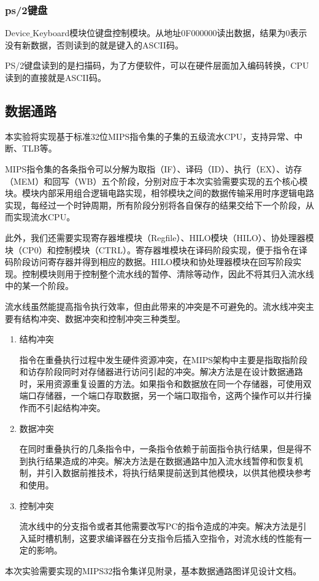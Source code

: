 \subsubsection{ps/2键盘}
Device$\_$Keyboard模块位键盘控制模块。从地址0F000000读出数据，结果为0表示没有新数据，否则读到的就是键入的ASCII码。

PS/2键盘读到的是扫描码，为了方便软件，可以在硬件层面加入编码转换，CPU读到的直接就是ASCII码。
\subsection{数据通路}
本实验将实现基于标准32位MIPS指令集的子集的五级流水CPU，支持异常、中断、TLB等。

MIPS指令集的各条指令可以分解为取指（IF）、译码（ID）、执行（EX）、访存（MEM）和回写（WB）五个阶段，分别对应于本次实验需要实现的五个核心模块。模块内部采用组合逻辑电路实现，相邻模块之间的数据传输采用时序逻辑电路实现，每经过一个时钟周期，所有阶段分别将各自保存的结果交给下一个阶段，从而实现流水CPU。

此外，我们还需要实现寄存器堆模块（Regfile）、HILO模块（HILO）、协处理器模块（CP0）和控制模块（CTRL）。寄存器堆模块在译码阶段实现，便于指令在译码阶段访问寄存器并得到相应的数据。HILO模块和协处理器模块在回写阶段实现。控制模块则用于控制整个流水线的暂停、清除等动作，因此不将其归入流水线中的某一个阶段。

流水线虽然能提高指令执行效率，但由此带来的冲突是不可避免的。流水线冲突主要有结构冲突、数据冲突和控制冲突三种类型。
\begin{enumerate}
\item 结构冲突

指令在重叠执行过程中发生硬件资源冲突，在MIPS架构中主要是指取指阶段和访存阶段同时对存储器进行访问引起的冲突。解决方法是在设计数据通路时，采用资源重复设置的方法。如果指令和数据放在同一个存储器，可使用双端口存储器，一个端口存取数据，另一个端口取指令，这两个操作可以并行操作而不引起结构冲突。

\item 数据冲突

在同时重叠执行的几条指令中，一条指令依赖于前面指令执行结果，但是得不到执行结果造成的冲突。解决方法是在数据通路中加入流水线暂停和恢复机制，并引入数据前推技术，将执行结果提前送到其他模块，以供其他模块参考和使用。

\item 控制冲突

流水线中的分支指令或者其他需要改写PC的指令造成的冲突。解决方法是引入延时槽机制，这要求编译器在分支指令后插入空指令，对流水线的性能有一定的影响。

\end{enumerate}

本次实验需要实现的MIPS32指令集详见附录，基本数据通路图详见设计文档。
